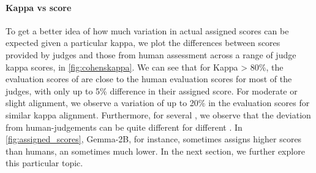 
\paragraph{Kappa vs score}
To get a better idea of how much variation in actual assigned scores can be expected given a particular kappa, we plot the differences between scores provided by judges and those from human assessment across a range of judge kappa scores, in \cref{fig:cohenskappa}.
We can see that for Kappa > 80\%, the evaluation scores of \judgemodels are close to the human evaluation scores for most of the judges, with only up to 5\% difference in their assigned score.
For moderate or slight alignment, we observe a variation of up to 20\% in the evaluation scores for similar kappa alignment.
Furthermore, for several \judgemodels, we observe that the deviation from human-judgements can be quite different for different \evaluatormodels.
In \cref{fig:assigned_scores}, Gemma-2B, for instance, sometimes assigns higher scores than humans, an sometimes much lower.
In the next section, we further explore this particular topic.
